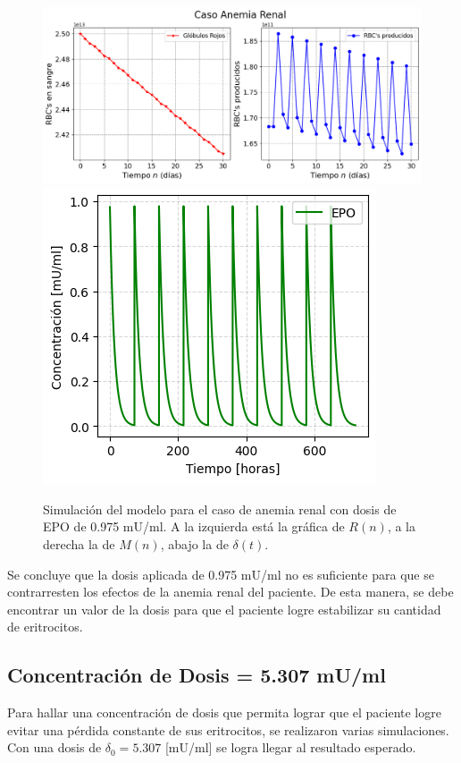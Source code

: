 \begin{figure}[H]
    \centering
    \captionsetup{justification=centering}
    \includegraphics[scale=0.534]{figures/AR11.png}
    \includegraphics[scale=0.8]{figures/AR12.png}
    \caption{Simulación del modelo para el caso de anemia renal con dosis de EPO de 0.975 mU/ml. A la izquierda está la gráfica de $R(n)$, a la derecha la de $M(n)$, abajo la de $\delta(t)$.}
    \label{sec:variaciones:fig:Anemia1}
\end{figure}

Se concluye que la dosis aplicada de 0.975 mU/ml no es suficiente para que se contrarresten los efectos de la anemia renal del paciente. De esta manera, se debe encontrar un valor de la dosis para que el paciente logre estabilizar su cantidad de eritrocitos.

\subsection{Concentración de Dosis = 5.307 mU/ml}\label{subsec:variaciones:anemia:bien}

Para hallar una concentración de dosis que permita lograr que el paciente logre evitar una pérdida constante de sus eritrocitos, se realizaron varias simulaciones. Con una dosis de $\delta_0 = 5.307$ [mU/ml] se logra llegar al resultado esperado.


